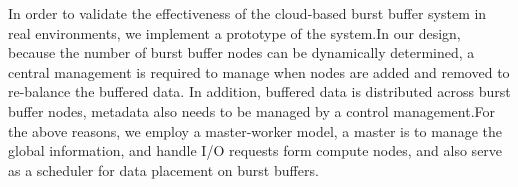 % 
% 
% 

In order to validate the effectiveness of the cloud-based burst buffer system in
real environments, we implement a prototype of the system.In our design,
because the number of burst buffer nodes can be dynamically determined, a central management is required to manage when nodes are added and
removed to re-balance the buffered data. In addition, buffered data is
distributed across burst buffer nodes, metadata also needs to be managed by a
control management.For the above reasons, we employ a master-worker model, 
a master is to manage the global information, and handle I/O requests form
compute nodes, and also serve as a scheduler for data placement on burst
buffers.

